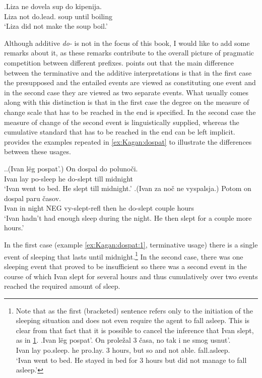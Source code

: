 \exg.\label{ex:do:PP:ne}Liza ne dovela sup do kipenija.\\
Liza not do.lead. soup until boiling\\
\trans `Liza did not make the soup boil.'

Although additive \textit{do-} is not in the focus of this book, I would like to add some remarks about it, as these remarks contribute to the overall picture of pragmatic competition between different prefixes. \citet[79]{Kagan:book} points out that the main difference between the terminative and the additive interpretations is that in the first case the presupposed and the entailed events are viewed as constituting one event and in the second case they are viewed as two separate events. What usually comes along with this distinction is that in the first case the degree on the measure of change scale that has to be reached in the end is specified. In the second case the measure of change of the second event is linguistically supplied, whereas the cumulative standard that has to be reached in the end can be left implicit. \citet[79]{Kagan:book} provides the examples repeated in \ref{ex:Kagan:dospat} to illustrate the differences between these usages.

\ex.\label{ex:Kagan:dospat}\ag.\label{ex:Kagan:dospat:1}(Ivan l\"{e}g pospat'.) On dospal do poluno\v{c}i.\\
Ivan lay po-sleep he do-slept till midnight\\
\trans `Ivan went to bed. He slept till midnight.'
\bg.\label{ex:Kagan:dospat:2}(Ivan za no\v{c} ne vyspalsja.) Potom on dospal paru \v{c}asov.\\
Ivan in night NEG vy-slept-refl then he do-slept couple hours\\
\trans `Ivan hadn't had enough sleep during the night. He then slept for a couple more hours.'

In the first case (example \ref{ex:Kagan:dospat:1}, terminative usage) there is a single event of sleeping that lasts until midnight.\footnote{Note that as the first (bracketed) sentence refers only to the initiation of the sleeping situation and does not even require the agent to fall asleep. This is clear from that fact that it is possible to cancel the inference that Ivan slept, as in \ref{ex:dospat:no}.
\exg.\label{ex:dospat:no}Ivan l\"{e}g pospat'. On prole\v{z}al 3 \v{c}asa, no tak i ne smog usnut'.\\
Ivan lay po.sleep. he pro.lay. 3 hours, but so and not able. fall.asleep.\\
\trans `Ivan went to bed. He stayed in bed for 3 hours but did not manage to fall asleep.'

} In the second case, there was one sleeping event that proved to be insufficient so there was a second event in the course of which Ivan slept for several hours and thus cumulatively over two events reached the required amount of sleep. 

